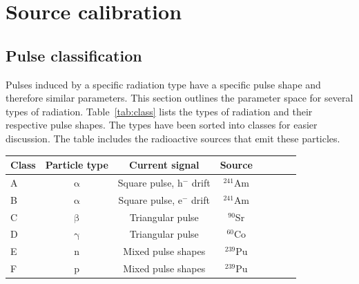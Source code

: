 \section{Source calibration}
\label{sec:sourcecalib}

\subsection{Pulse classification}
\label{sec:radclass}

Pulses induced by a specific radiation type have a specific pulse shape and therefore similar parameters. This section outlines the parameter space for several types of radiation. Table~\ref{tab:class} lists the types of radiation and their respective pulse shapes. The  types have been sorted into classes for easier discussion. The table includes the radioactive sources that emit these particles. 

\begin{footnotesize}
\begin{center}
\begin{tabular}{l c c c c c c c}
\hline
Class & Particle type & Current signal & Source   \\
\hline
A & $\upalpha$        & Square pulse, h$^-$ drift & $^{241}$Am  \\
B & $\upalpha$        & Square pulse, e$^-$ drift & $^{241}$Am   \\
C & $\upbeta$         & Triangular pulse               & $^{90}$Sr  \\
D & $\upgamma$    & Triangular pulse               & $^{60}$Co   \\
E & n                       &  Mixed pulse shapes        & $^{239}$Pu  \\
F & p                       & Mixed pulse shapes         & $^{239}$Pu  \\ 
\hline
\end{tabular}
\label{tab:class}
\end{center}
\end{footnotesize}


\clearpage

